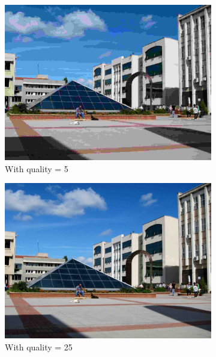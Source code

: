 \documentclass[12pt]{article}
\begin{document}
\begin{figure}[H]
    \centering
    \begin{subfigure}{0.45\textwidth}
        \centering
        \includegraphics[height=0.75\textwidth]{images/kuzey-5.jpg}
        \caption{With quality = 5}
        \label{jpeg-5}
    \end{subfigure}
    \begin{subfigure}{0.45\textwidth}
        \centering
        \includegraphics[height=0.75\textwidth]{images/kuzey-25.jpg}
        \caption{With quality = 25}
        \label{jpeg-25}
    \end{subfigure}
    \begin{subfigure}{0.45\textwidth}
        \centering

\end{subfigure}
\end{figure}
\end{document}
